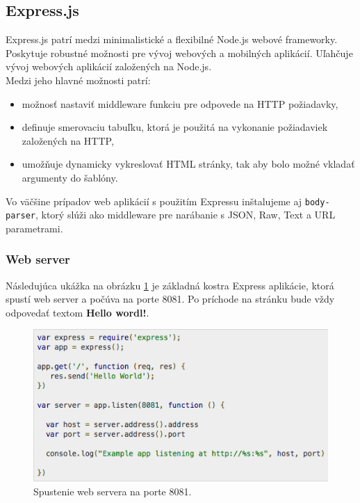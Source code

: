\subsection{Express.js}
Express.js patrí medzi minimalistické a flexibilné Node.js webové frameworky. Poskytuje robustné možnosti pre vývoj webových a mobilných aplikácií. Uľahčuje vývoj webových aplikácií založených na Node.js.\cite{express-tutorial}\\

\noindent Medzi jeho hlavné možnosti patrí:
\begin{itemize}
\item možnosť nastaviť middleware funkciu pre odpovede na HTTP požiadavky,
\item definuje smerovaciu tabuľku, ktorá je použitá na vykonanie požiadaviek založených na HTTP,
\item umožňuje dynamicky vykreslovať HTML stránky, tak aby bolo možné vkladať argumenty do šablóny.
\end{itemize}

Vo väčšine prípadov web aplikácií s použitím Expressu inštalujeme aj \verb|body-parser|, ktorý slúži ako middleware pre narábanie s JSON, Raw, Text a URL parametrami.

\subsubsection{Web server}
Následujúca ukážka na obrázku \ref{img-express-base} je základná kostra Express aplikácie, ktorá spustí web server a počúva na porte 8081. Po príchode na stránku bude vždy odpovedať textom \textbf{Hello wordl!}.\cite{express-tutorial}

\begin{figure}[H]
  \centering
  \includegraphics[scale=0.7]{img/express/express-example.png}
  \caption{Spustenie web servera na porte 8081.}
  \label{img-express-base}
\end{figure}

